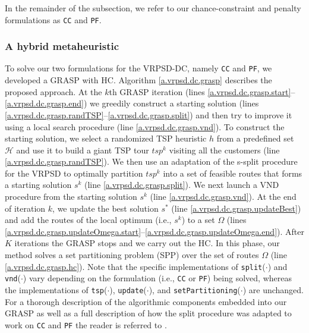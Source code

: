 In the remainder of the subsection, we refer to our chance-constraint and penalty formulations as \verb"CC" and \verb"PF".

\subsubsection{A hybrid metaheuristic}\label{s.vrpsd.dc.grasp}
To solve our two formulations for the VRPSD-DC, namely \texttt{CC} and \texttt{PF}, we developed a GRASP with HC. Algorithm \ref{a.vrpsd.dc.grasp} describes the proposed approach. At the $k$th GRASP iteration  (lines \ref{a.vrpsd.dc.grasp.start}--\ref{a.vrpsd.dc.grasp.end}) we greedily construct a starting solution (lines \ref{a.vrpsd.dc.grasp.randTSP}--\ref{a.vrpsd.dc.grasp.split}) and then try to improve it using a local search procedure (line \ref{a.vrpsd.dc.grasp.vnd}). To construct the starting solution, we select a randomized TSP heuristic $h$ from a predefined set $\mathcal{H}$ and use it to build a giant TSP tour $tsp^{k}$ visiting all the customers (line \ref{a.vrpsd.dc.grasp.randTSP}). We then use an adaptation of the s-split procedure for the VRPSD \citep{Mendoza2011} to optimally partition $tsp^{k}$ into a set of feasible routes that forms a starting solution $s^{k}$ (line \ref{a.vrpsd.dc.grasp.split}). We next launch a VND procedure from the starting solution $s^{k}$ (line \ref{a.vrpsd.dc.grasp.vnd}). At the end of iteration $k$, we update the best solution $s^{*}$ (line \ref{a.vrpsd.dc.grasp.updateBest}) and add the routes of the local optimum (i.e., $s^k$) to a set $\Omega$ (lines \ref{a.vrpsd.dc.grasp.updateOmega.start}--\ref{a.vrpsd.dc.grasp.updateOmega.end}). After $K$ iterations the GRASP stops and we carry out the HC. In this phase, our method solves a set partitioning problem (SPP) over the set of routes $\Omega$ (line \ref{a.vrpsd.dc.grasp.hc}). Note that the specific implementations of \verb"split"($\cdot$) and \verb"vnd"($\cdot$) vary depending on the formulation (i.e., \texttt{CC} or \texttt{PF}) being solved, whereas the implementations of \verb"tsp"($\cdot$), \verb"update"($\cdot$), and \verb"setPartitioning"($\cdot$) are unchanged. For a thorough description of the algorithmic components embedded into our GRASP as well as a full description of how the split procedure was adapted to work on \texttt{CC} and \texttt{PF} the reader is referred to \cite{Mendoza2015}.

